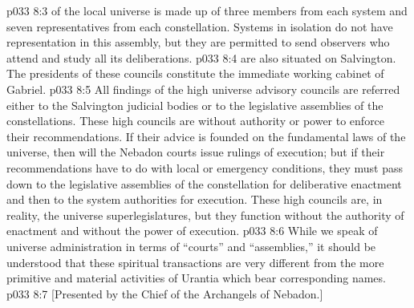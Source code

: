 \vs p033 8:3 \pc {} of the local universe is made up of three members from each system and seven representatives from each constellation. Systems in isolation do not have representation in this assembly, but they are permitted to send observers who attend and study all its deliberations.
\vs p033 8:4 \pc {} are also situated on Salvington. The presidents of these councils constitute the immediate working cabinet of Gabriel.
\vs p033 8:5 \pc All findings of the high universe advisory councils are referred either to the Salvington judicial bodies or to the legislative assemblies of the constellations. These high councils are without authority or power to enforce their recommendations. If their advice is founded on the fundamental laws of the universe, then will the Nebadon courts issue rulings of execution; but if their recommendations have to do with local or emergency conditions, they must pass down to the legislative assemblies of the constellation for deliberative enactment and then to the system authorities for execution. These high councils are, in reality, the universe superlegislatures, but they function without the authority of enactment and without the power of execution.
\vs p033 8:6 While we speak of universe administration in terms of “courts” and “assemblies,” it should be understood that these spiritual transactions are very different from the more primitive and material activities of Urantia which bear corresponding names.
\vsetoff
\vs p033 8:7 [Presented by the Chief of the Archangels of Nebadon.]
\quizlink
